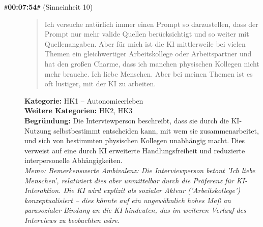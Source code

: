 \begin{description}
  \item[\texttt{\#}\textbf{00:07:54}\texttt{\#} (Sinneinheit 10)]
  \begin{quote}
  Ich versuche natürlich immer einen Prompt so darzustellen, dass der Prompt nur mehr valide Quellen berücksichtigt und so weiter mit Quellenangaben. Aber für mich ist die KI mittlerweile bei vielen Themen ein gleichwertiger Arbeitskollege oder Arbeitspartner und hat den großen Charme, dass ich manchen physischen Kollegen nicht mehr brauche. Ich liebe Menschen. Aber bei meinen Themen ist es oft lustiger, mit der KI zu arbeiten.
  \end{quote}
  \textbf{Kategorie:} HK1 -- Autonomieerleben\\
  \textbf{Weitere Kategorien:} HK2, HK3\\
  \textbf{Begr\"undung:} Die Interviewperson beschreibt, dass sie durch die KI-Nutzung selbstbestimmt entscheiden kann, mit wem sie zusammenarbeitet, und sich von bestimmten physischen Kollegen unabhängig macht. Dies verweist auf eine durch KI erweiterte Handlungsfreiheit und reduzierte interpersonelle Abhängigkeiten.
  \\\textit{Memo: Bemerkenswerte Ambivalenz: Die Interviewperson betont 'Ich liebe Menschen', relativiert dies aber unmittelbar durch die Präferenz für KI-Interaktion. Die KI wird explizit als sozialer Akteur ('Arbeitskollege') konzeptualisiert – dies könnte auf ein ungewöhnlich hohes Maß an parasozialer Bindung an die KI hindeuten, das im weiteren Verlauf des Interviews zu beobachten wäre.}
\end{description}
\medskip

